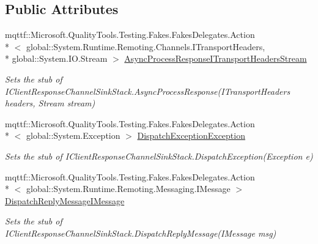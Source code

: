\subsection*{Public Attributes}
\begin{DoxyCompactItemize}
\item 
mqttf\-::\-Microsoft.\-Quality\-Tools.\-Testing.\-Fakes.\-Fakes\-Delegates.\-Action\\*
$<$ global\-::\-System.\-Runtime.\-Remoting.\-Channels.\-I\-Transport\-Headers, \\*
global\-::\-System.\-I\-O.\-Stream $>$ \hyperlink{class_system_1_1_runtime_1_1_remoting_1_1_channels_1_1_fakes_1_1_stub_i_client_response_channel_sink_stack_ad21faa5cf213db81addf3a4f4d23fb10}{Async\-Process\-Response\-I\-Transport\-Headers\-Stream}
\begin{DoxyCompactList}\small\item\em Sets the stub of I\-Client\-Response\-Channel\-Sink\-Stack.\-Async\-Process\-Response(\-I\-Transport\-Headers headers, Stream stream)\end{DoxyCompactList}\item 
mqttf\-::\-Microsoft.\-Quality\-Tools.\-Testing.\-Fakes.\-Fakes\-Delegates.\-Action\\*
$<$ global\-::\-System.\-Exception $>$ \hyperlink{class_system_1_1_runtime_1_1_remoting_1_1_channels_1_1_fakes_1_1_stub_i_client_response_channel_sink_stack_a23cccebe10790d4e53de03947be72aca}{Dispatch\-Exception\-Exception}
\begin{DoxyCompactList}\small\item\em Sets the stub of I\-Client\-Response\-Channel\-Sink\-Stack.\-Dispatch\-Exception(\-Exception e)\end{DoxyCompactList}\item 
mqttf\-::\-Microsoft.\-Quality\-Tools.\-Testing.\-Fakes.\-Fakes\-Delegates.\-Action\\*
$<$ global\-::\-System.\-Runtime.\-Remoting.\-Messaging.\-I\-Message $>$ \hyperlink{class_system_1_1_runtime_1_1_remoting_1_1_channels_1_1_fakes_1_1_stub_i_client_response_channel_sink_stack_adc1436f7bf67f3d335e81df39ec6f0b3}{Dispatch\-Reply\-Message\-I\-Message}
\begin{DoxyCompactList}\small\item\em Sets the stub of I\-Client\-Response\-Channel\-Sink\-Stack.\-Dispatch\-Reply\-Message(\-I\-Message msg)\end{DoxyCompactList}\end{DoxyCompactItemize}


